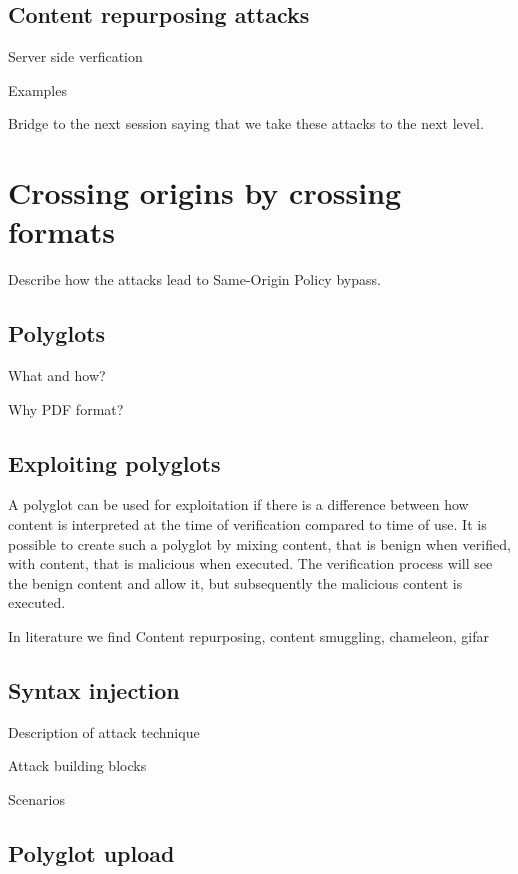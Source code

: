 \documentclass[10pt, conference, compsocconf]{IEEEtran}
\begin{document}
\subsection{Content repurposing attacks}

Server side verfication

Examples


Bridge to the next session saying that we take these attacks to the
next level.

\section{Crossing origins by crossing formats}

Describe how the attacks lead to Same-Origin Policy bypass.

\subsection{Polyglots}

What and how?

Why PDF format?

\subsection{Exploiting polyglots}

A polyglot can be used for exploitation if there is a difference between how 
content is interpreted at the time of verification compared to time of use. 
It is possible to create such a polyglot by mixing content, that is benign when verified, with content, that is 
malicious when executed. The verification process will see the benign content 
and allow it, but subsequently the malicious content is executed.

In literature we find Content repurposing, content smuggling, chameleon, gifar

\subsection{Syntax injection}

Description of attack technique

Attack building blocks

Scenarios

\subsection{Polyglot upload}
\end{document}
